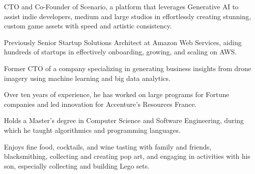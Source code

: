 
\begin{cvparagraph}

CTO and Co-Founder of Scenario, a platform that leverages Generative AI to assist indie developers, medium and large studios in effortlessly creating stunning, custom game assets with speed and artistic consistency.

Previously Senior Startup Solutions Architect at Amazon Web Services, aiding hundreds of startups in effectively onboarding, growing, and scaling on AWS.

Former CTO of a company specializing in generating business insights from drone imagery using machine learning and big data analytics.

Over ten years of experience, he has worked on large programs for Fortune companies and led innovation for Accenture’s Resources France.

Holds a Master’s degree in Computer Science and Software Engineering, during which he taught algorithmics and programming languages.

Enjoys fine food, cocktails, and wine tasting with family and friends, blacksmithing, collecting and creating pop art, and engaging in activities with his son, especially collecting and building Lego sets.
\end{cvparagraph}

